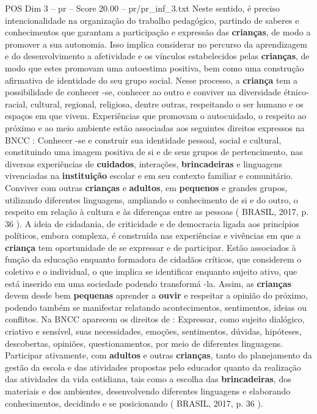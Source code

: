 \begin{textsample}{POS Dim 3 – pr – Score 20.00 – pr/pr\_inf\_3.txt}
Neste sentido, é preciso intencionalidade na organização do trabalho pedagógico, partindo de saberes e conhecimentos que garantam a participação e expressão das \textbf{crianças}, de modo a promover a sua autonomia.
Isso implica considerar no percurso da aprendizagem e do desenvolvimento a afetividade e os vínculos estabelecidos pelas \textbf{crianças}, de modo que estes promovam uma autoestima positiva, bem como uma construção afirmativa de identidade do seu grupo social.
Nesse processo, a \textbf{criança} tem a possibilidade de conhecer -se, conhecer ao outro e conviver na diversidade étnico-racial, cultural, regional, religiosa, dentre outras, respeitando o ser humano e os espaços em que vivem.
Experiências que promovam o autocuidado, o respeito ao próximo e ao meio ambiente estão associadas aos seguintes direitos expressos na BNCC : Conhecer -se e construir sua identidade pessoal, social e cultural, constituindo uma imagem positiva de si e de seus grupos de pertencimento, nas diversas experiências de \textbf{cuidados}, interações, \textbf{brincadeiras} e linguagens vivenciadas na \textbf{instituição} escolar e em seu contexto familiar e comunitário.
Conviver com outras \textbf{crianças} e \textbf{adultos}, em \textbf{pequenos} e grandes grupos, utilizando diferentes linguagens, ampliando o conhecimento de si e do outro, o respeito em relação à cultura e às diferenças entre as pessoas ( BRASIL, 2017, p. 36 ).
A ideia de cidadania, de criticidade e de democracia ligada aos princípios políticos, embora complexa, é construída nas experiências e vivências em que a \textbf{criança} tem oportunidade de se expressar e de participar.
Estão associados à função da educação enquanto formadora de cidadãos críticos, que considerem o coletivo e o individual, o que implica se identificar enquanto sujeito ativo, que está inserido em uma sociedade podendo transformá -la.
Assim, as \textbf{crianças} devem desde bem \textbf{pequenas} aprender a \textbf{ouvir} e respeitar a opinião do próximo, podendo também se manifestar relatando acontecimentos, sentimentos, ideias ou conflitos.
Na BNCC aparecem os direitos de : Expressar, como sujeito dialógico, criativo e sensível, suas necessidades, emoções, sentimentos, dúvidas, hipóteses, descobertas, opiniões, questionamentos, por meio de diferentes linguagens.
Participar ativamente, com \textbf{adultos} e outras \textbf{crianças}, tanto do planejamento da gestão da escola e das atividades propostas pelo educador quanto da realização das atividades da vida cotidiana, tais como a escolha das \textbf{brincadeiras}, dos materiais e dos ambientes, desenvolvendo diferentes linguagens e elaborando conhecimentos, decidindo e se posicionando ( BRASIL, 2017, p. 36 ).

\end{textsample}

